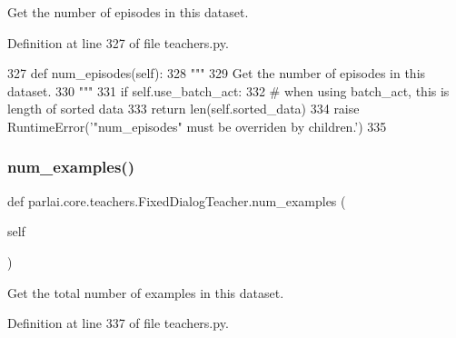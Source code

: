 \begin{DoxyVerb}Get the number of episodes in this dataset.
\end{DoxyVerb}
 

Definition at line 327 of file teachers.\+py.


\begin{DoxyCode}
327     \textcolor{keyword}{def }num\_episodes(self):
328         \textcolor{stringliteral}{"""}
329 \textcolor{stringliteral}{        Get the number of episodes in this dataset.}
330 \textcolor{stringliteral}{        """}
331         \textcolor{keywordflow}{if} self.use\_batch\_act:
332             \textcolor{comment}{# when using batch\_act, this is length of sorted data}
333             \textcolor{keywordflow}{return} len(self.sorted\_data)
334         \textcolor{keywordflow}{raise} RuntimeError(\textcolor{stringliteral}{'"num\_episodes" must be overriden by children.'})
335 
\end{DoxyCode}
\mbox{\label{classparlai_1_1core_1_1teachers_1_1FixedDialogTeacher_a38bd0d5c98506c45eb87d6db32d1c0bf}} 
\subsubsection{\texorpdfstring{num\+\_\+examples()}{num\_examples()}}
{\footnotesize\ttfamily def parlai.\+core.\+teachers.\+Fixed\+Dialog\+Teacher.\+num\+\_\+examples (\begin{DoxyParamCaption}\item[{}]{self }\end{DoxyParamCaption})}

\begin{DoxyVerb}Get the total number of examples in this dataset.
\end{DoxyVerb}
 

Definition at line 337 of file teachers.\+py.


